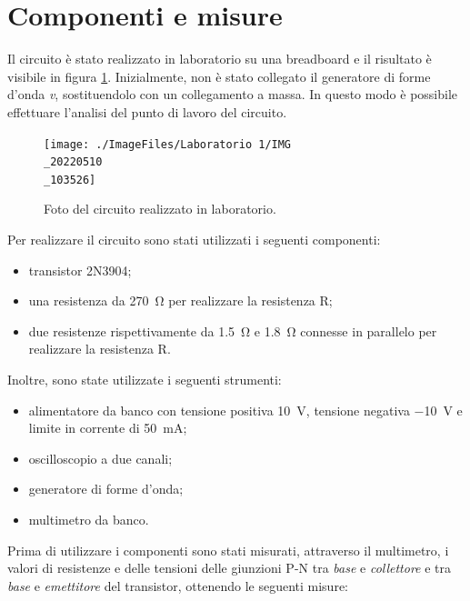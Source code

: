 \section{Componenti e misure}
Il circuito è stato realizzato in laboratorio su una breadboard e il risultato è visibile in figura \ref{fig:emitterfollwer_circuito}. Inizialmente, non è stato collegato il generatore di forme d'onda \textit{v}, sostituendolo con un collegamento a massa. In questo modo è possibile effettuare l'analisi del punto di lavoro del circuito.
\begin{figure}[h!]
	\centering
	\texttt{[image: ./ImageFiles/Laboratorio 1/IMG\\\_20220510\\\_103526]}
	\caption{Foto del circuito realizzato in laboratorio.}
	\label{fig:emitterfollwer_circuito}
\end{figure}

Per realizzare il circuito sono stati utilizzati i seguenti componenti: 
\begin{itemize}
	\item transistor 2N3904;
	\item una resistenza da \SI{270}{\ohm} per realizzare la resistenza R;
	\item due resistenze rispettivamente da \SI{1.5}{\ohm} e \SI{1.8}{\ohm} connesse in parallelo per realizzare la resistenza R.
\end{itemize}
Inoltre, sono state utilizzate i seguenti strumenti:
\begin{itemize}
	\item alimentatore da banco con tensione positiva \SI{10}{\volt}, tensione negativa \SI{-10}{\volt} e limite in corrente di \SI{50}{\milli\ampere};
	\item oscilloscopio a due canali;
	\item generatore di forme d'onda;
	\item multimetro da banco.
\end{itemize}

Prima di utilizzare i componenti sono stati misurati, attraverso il multimetro, i valori di resistenze e delle tensioni delle giunzioni P-N tra \textit{base} e \textit{collettore} e tra \textit{base} e \textit{emettitore} del transistor, ottenendo le seguenti misure:

